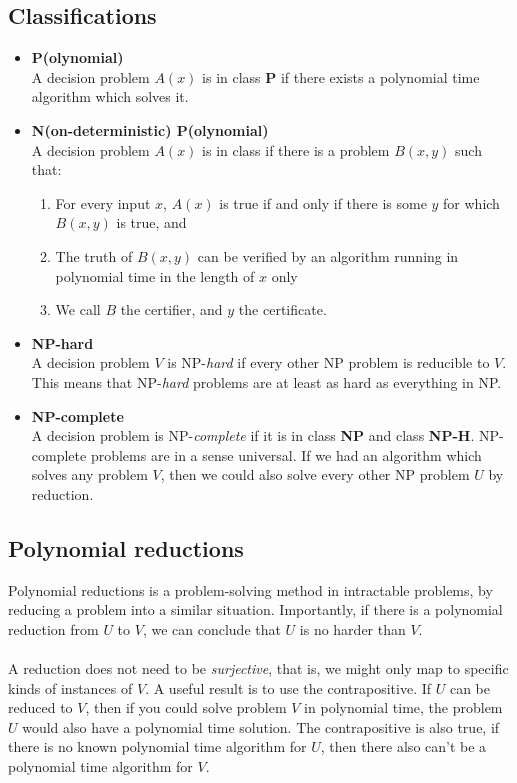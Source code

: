 \documentclass[journal, letterpaper]{IEEEtran}
\begin{document}
  \subsection{Classifications}
  \begin{itemize}
    \item \textbf{P(olynomial)}\\ A decision problem $A(x)$ is in class \textbf{P} if there exists a polynomial time
      algorithm which solves it.
    \item \textbf{N(on-deterministic) P(olynomial)} \\A decision problem $A(x)$ is in class  if there is a 
      problem $B(x, y)$ such that:
      \begin{enumerate}
        \item For every input $x$, $A(x)$ is true if and only if there is some $y$ for which $B(x, y)$ is true, and
        \item The truth of $B(x, y)$ can be verified by an algorithm running in polynomial time in the length of $x$ only
        \item We call $B$ the certifier, and $y$ the certificate.
      \end{enumerate}
    \item \textbf{NP-hard} \\A decision problem $V$ is NP-\emph{hard} if every other NP problem is reducible to $V$. This means that
      NP-\emph{hard} problems are at least as hard as everything in NP.
    \item \textbf{NP-complete}\\ A decision problem is NP-\emph{complete} if it is in class \textbf{NP} and class \textbf{NP-H}. 
      NP-complete problems are in a sense universal. If we had an algorithm which solves any problem $V$, then we could also
      solve every other NP problem $U$ by reduction.
  \end{itemize}
  \subsection{Polynomial reductions}
  Polynomial reductions is a problem-solving method in intractable problems, by reducing a problem into a similar situation. Importantly,
  if there is a polynomial reduction from $U$ to $V$, we can conclude that $U$ is no harder than $V$. \\ \\ 
  A reduction does not need to be \emph{surjective}, that is, we might only map to specific kinds of instances of $V$. A useful
  result is to use the contrapositive. If $U$ can be reduced to $V$, then if you could solve problem $V$ in polynomial time,
  the problem $U$ would also have a polynomial time solution. The contrapositive is also true, if there is no known polynomial
  time algorithm for $U$, then there also can't be a polynomial time algorithm for $V$.
\end{document}
